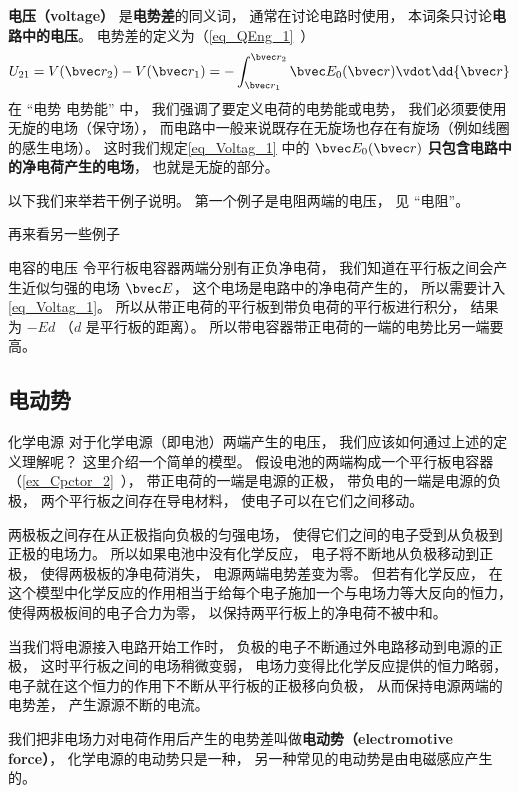 

\textbf{电压（voltage）} 是\textbf{电势差}的同义词， 通常在讨论电路时使用， 本词条只讨论\textbf{电路中的电压}。 电势差的定义为（\autoref{eq_QEng_1}~）
\begin{equation}\label{eq_Voltag_1}
U_{21} = V(\bvec r_2) - V(\bvec r_1) = - \int_{\bvec r_1}^{\bvec r_2} \bvec E_0(\bvec r) \vdot \dd{\bvec r}
\end{equation}
在 “电势 电势能” 中， 我们强调了要定义电荷的电势能或电势， 我们必须要使用无旋的电场（保守场）， 而电路中一般来说既存在无旋场也存在有旋场（例如线圈的感生电场）。 这时我们规定\autoref{eq_Voltag_1} 中的 $\bvec E_0(\bvec r)$ \textbf{只包含电路中的净电荷产生的电场}， 也就是无旋的部分。

以下我们来举若干例子说明。 第一个例子是电阻两端的电压， 见 “电阻”。

再来看另一些例子
\begin{example}{电容的电压}
令平行板电容器两端分别有正负净电荷， 我们知道在平行板之间会产生近似匀强的电场 $\bvec E$， 这个电场是电路中的净电荷产生的， 所以需要计入\autoref{eq_Voltag_1}。 所以从带正电荷的平行板到带负电荷的平行板进行积分， 结果为 $-E d$ （$d$ 是平行板的距离）。 所以带电容器带正电荷的一端的电势比另一端要高。
\end{example}

\subsection{电动势}
\begin{example}{化学电源}
对于化学电源（即电池）两端产生的电压， 我们应该如何通过上述的定义理解呢？ 这里介绍一个简单的模型。 假设电池的两端构成一个平行板电容器（\autoref{ex_Cpctor_2}~）， 带正电荷的一端是电源的正极， 带负电的一端是电源的负极， 两个平行板之间存在导电材料， 使电子可以在它们之间移动。

两极板之间存在从正极指向负极的匀强电场， 使得它们之间的电子受到从负极到正极的电场力。 所以如果电池中没有化学反应， 电子将不断地从负极移动到正极， 使得两极板的净电荷消失， 电源两端电势差变为零。 但若有化学反应， 在这个模型中化学反应的作用相当于给每个电子施加一个与电场力等大反向的恒力， 使得两极板间的电子合力为零， 以保持两平行板上的净电荷不被中和。

当我们将电源接入电路开始工作时， 负极的电子不断通过外电路移动到电源的正极， 这时平行板之间的电场稍微变弱， 电场力变得比化学反应提供的恒力略弱， 电子就在这个恒力的作用下不断从平行板的正极移向负极， 从而保持电源两端的电势差， 产生源源不断的电流。
\end{example}
我们把非电场力对电荷作用后产生的电势差叫做\textbf{电动势（electromotive force）}， 化学电源的电动势只是一种， 另一种常见的电动势是由电磁感应产生的。

